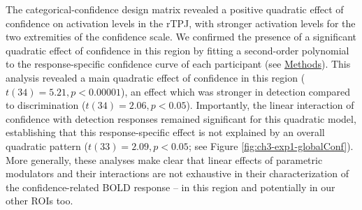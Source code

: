 \documentclass[12pt,twoside]{reedthesis}
\begin{document}
The categorical-confidence design matrix revealed a positive quadratic effect of confidence on activation levels in the rTPJ, with stronger activation levels for the two extremities of the confidence scale. We confirmed the presence of a significant quadratic effect of confidence in this region by fitting a second-order polynomial to the response-specific confidence curve of each participant (see \href{@categoricalDM}{Methods}). This analysis revealed a main quadratic effect of confidence in this region (\(t(34) = 5.21, p<0.00001\)), an effect which was stronger in detection compared to discrimination (\(t(34)=2.06, p<0.05\)). Importantly, the linear interaction of confidence with detection responses remained significant for this quadratic model, establishing that this response-specific effect is not explained by an overall quadratic pattern (\(t(33)=2.09, p<0.05\); see Figure \ref{fig:ch3-exp1-globalConf}). More generally, these analyses make clear that linear effects of parametric modulators and their interactions are not exhaustive in their characterization of the confidence-related BOLD response -- in this region and potentially in our other ROIs too.
\end{document}
